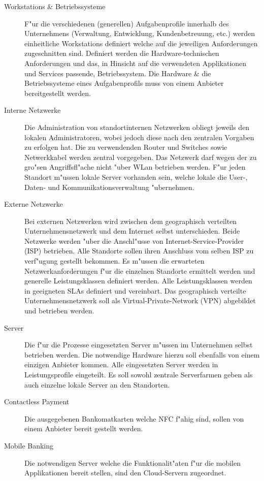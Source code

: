 \begin{description}

	\item[Workstations \& Betriebssysteme] F"ur die verschiedenen (generellen) Aufgabenprofile innerhalb des Unternehmens (Verwaltung, Entwicklung, Kundenbetreuung, etc.) werden einheitliche Workstations definiert welche auf die jeweiligen Anforderungen zugeschnitten sind. Definiert werden die Hardware-technischen Anforderungen und das, in Hinsicht auf die verwendeten Applikationen und Services passende, Betriebssystem.  Die Hardware \& die Betriebssysteme eines Aufgabenprofils muss von einem Anbieter bereitgestellt werden.
	
	\item[Interne Netzwerke] Die Administration von standortinternen Netzwerken obliegt jeweils den lokalen Administratoren, wobei jedoch diese nach den zentralen Vorgaben zu erfolgen hat. Die zu verwendenden Router und Switches sowie Netwerkkabel werden zentral vorgegeben. Das Netzwerk darf wegen der zu gro"sen Angriffsfl"ache nicht "uber WLan betrieben werden. F"ur jeden Standort m"ussen lokale Server vorhanden sein, welche lokale die User-, Daten- und Kommunikationsverwaltung "ubernehmen. 
	
	\item[Externe Netzwerke] Bei externen Netzwerken wird zwischen dem geographisch verteilten Unternehmensnetzwerk und dem Internet selbst unterschieden. Beide Netzwerke werden "uber die Anschl"usse von Internet-Service-Provider (ISP) betrieben. Alle Standorte sollen ihren Anschluss vom selben ISP zu verf"ugung gestellt bekommen. Es m"ussen die erwarteten Netzwerkanforderungen f"ur die einzelnen Standorte ermittelt werden und generelle Leistungsklassen definiert werden. Alle Leistungsklassen werden in geeigneten SLAs definiert und vereinbart. Das geographisch verteilte Unternehmensnetzwerk soll als Virtual-Private-Network (VPN) abgebildet und betrieben werden. 
	
	\item[Server] Die f"ur die Prozesse eingesetzten Server m"ussen im Unternehmen selbst betrieben werden. Die notwendige Hardware hierzu soll ebenfalls von einem einzigen Anbieter kommen. Alle eingesetzten Server werden in Leistungsprofile eingeteilt. Es soll sowohl zentrale Serverfarmen geben als auch einzelne lokale Server an den Standorten.

	\item[Contactless Payment] Die ausgegebenen Bankomatkarten welche NFC f"ahig sind, sollen von einem Anbieter bereit gestellt werden.
	
	\item[Mobile Banking] Die notwendigen Server welche die Funktionalit"aten f"ur die mobilen Applikationen bereit stellen, sind den Cloud-Servern zugeordnet. 
 
\end{description}

